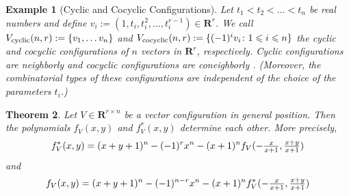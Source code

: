 \documentclass[11pt]{article}
\newtheorem{theorem}{Theorem}
\newtheorem{example}[theorem]{Example}
\renewcommand{\leq}{\leqslant}
\newcommand{\R}{\mathbf{R}}
\newcommand{\cyclic}{V_{\textup{cyclic}}}
\newcommand{\cocyclic}{V_{\textup{cocyclic}}}
\begin{document}
%
%
\begin{example}[{Cyclic and Cocyclic Configurations}]
\label{ex:cyclic-cocyclic}
Let $t_1<t_2<\dots<t_n$ be real numbers and define $v_i:= (1,t_i,t_i^2,\dots,t_i^{r-1}) \in \R^r$. We call $\cyclic(n,r):=\{v_1,\dots v_n\}$ and $\cocyclic(n,r):=\{(-1)^i v_i\colon 1\leq i\leq n\}$ the \emph{cyclic} and \emph{cocyclic} configurations of $n$ vectors in $\R^r$, respectively. Cyclic configurations are neighborly and cocyclic configurations are  
coneighborly \cite[Cor. 0.8]{Ziegler:1995aa}. (Moreover, the combinatorial types of these configurations are independent of the choice of the parameters $t_i$.)
\end{example}
%
\begin{theorem} 
\label{thm:f-fstar}
Let $V \in \R^{r\times n}$ be a vector configuration in general position. Then the polynomials $f_V(x,y)$ and $f^*_V(x,y)$ determine each other. More precisely,
\begin{equation}
\label{eq:fstar-f}
\hfill
f^*_V(x,y)=(x+y+1)^n - (-1)^r x^n -(x+1)^n f_V(\textstyle -\frac{x}{x+1},\frac{x+y}{x+1})
\hfill
\end{equation}
and
\begin{equation}
\label{eq:f-fstar}
\hfill
f_V(x,y)=(x+y+1)^n - (-1)^{n-r} x^n -(x+1)^n f^*_V(\textstyle -\frac{x}{x+1},\frac{x+y}{x+1})
\hfill
\end{equation}
\end{theorem}
%
\end{document}
